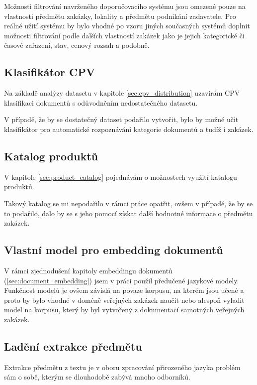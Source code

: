 \documentclass[thesis=M,czech]{FITthesis}[2019/12/23]
\begin{document}
Možnosti filtrování navrženého doporučovacího systému jsou omezené pouze na vlastnosti předmětu zakázky, lokality a předmětu podnikání zadavatele. Pro reálné užití systému by bylo vhodné po vzoru jiných současných systémů doplnit možnosti filtrování podle dalších vlastností zakázek jako je jejich kategorické či časové zařazení, stav, cenový rozsah a podobně.

\subsection{Klasifikátor CPV}

Na základě analýzy datasetu v kapitole \ref{sec:cpv_distribution} uzavírám CPV klasifikaci dokumentů s odůvodněním nedostatečného datasetu.

V případě, že by se dostatečný dataset podařilo vytvořit, bylo by možné učit klasifikátor pro automatické rozpoznávání kategorie dokumentů a tudíž i zakázek.

\subsection{Katalog produktů}

V kapitole \ref{sec:product_catalog} pojednávám o možnostech využití katalogu produktů.

Takový katalog se mi nepodařilo v rámci práce opatřit, ovšem v případě, že by se to podařilo, dalo by se s jeho pomocí získat další hodnotné informace o předmětu zakázek.

\subsection{Vlastní model pro embedding dokumentů}

V rámci zjednodušení kapitoly embeddingu dokumentů (\ref{sec:document_embedding}) jsem v práci použil předučené jazykové modely. Funkčnost modelů je ovšem závislá na povaze korpusu, na kterém jsou učené a proto by bylo vhodné v doméně veřejných zakázek naučit nebo alespoň vyladit model na korpusu, který by byl vytvořený z dokumentací samotných veřejných zakázek.

\subsection{Ladění extrakce předmětu}
Extrakce předmětu z textu je v oboru zpracování přirozeného jazyka problém sám o sobě, kterým se dlouhodobě zabývá mnoho odborníků.
\end{document}
